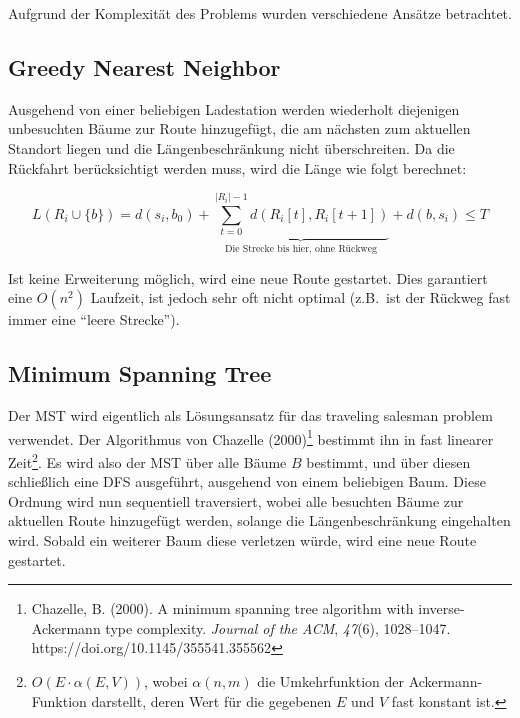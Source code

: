 \documentclass[a4paper,10pt,ngerman]{scrartcl}
\begin{document}
    Aufgrund der Komplexität des Problems wurden verschiedene Ansätze betrachtet.

    \subsection{Greedy Nearest Neighbor}
    Ausgehend von einer beliebigen Ladestation werden wiederholt diejenigen unbesuchten Bäume zur Route hinzugefügt,
    die am nächsten zum aktuellen Standort liegen und die Längenbeschränkung nicht überschreiten.
    Da die Rückfahrt berücksichtigt werden muss, wird die Länge wie folgt berechnet:

    \[
        L(R_i \cup \{b\}) = d(s_i, b_0) + \underbrace{\sum_{t=0}^{|R_i|-1} d(R_i[t], R_i[t+1])}_{\text{Die Strecke bis
        hier, ohne Rückweg}} + d(b, s_i) \leq T
    \]

    Ist keine Erweiterung möglich, wird eine neue Route gestartet. Dies garantiert eine $O(n^2)$ Laufzeit, ist jedoch
    sehr oft nicht optimal (z.B.\ ist der Rückweg fast immer eine ``leere Strecke'').

    \subsection{Minimum Spanning Tree}
    Der MST wird eigentlich als Lösungsansatz für das traveling salesman problem verwendet. Der Algorithmus von
    Chazelle (2000)\footnote{
        Chazelle, B. (2000). A minimum spanning tree algorithm with inverse-Ackermann type complexity.
        \textit{Journal of the ACM}, \textit{47}(6), 1028–1047. https://doi.org/10.1145/355541.355562
    } bestimmt ihn in fast linearer Zeit\footnote{
        $O(E \cdot \alpha(E, V))$, wobei $\alpha(n, m)$ die Umkehrfunktion der Ackermann-Funktion darstellt, deren Wert
        für die gegebenen $E$ und $V$ fast konstant ist.
    }.
    Es wird also der MST über alle Bäume $B$ bestimmt, und über diesen schließlich eine DFS ausgeführt, ausgehend von
    einem beliebigen Baum. Diese Ordnung wird nun sequentiell traversiert, wobei alle besuchten Bäume zur aktuellen
    Route hinzugefügt werden, solange die Längenbeschränkung eingehalten wird. Sobald ein weiterer Baum diese verletzen
    würde, wird eine neue Route gestartet.
\end{document}
